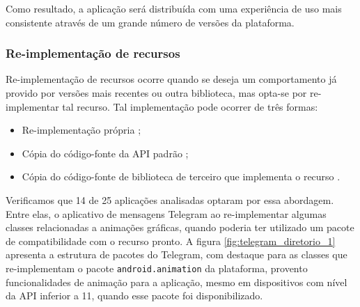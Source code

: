 Como resultado, a aplicação será distribuída com uma experiência de uso mais consistente
através de um grande número de versões da plataforma.

\subsubsection{Re-implementação de recursos}
\label{subsec:reimplementacao-recursos}

Re-implementação de recursos ocorre quando se deseja um comportamento já provido
por versões mais recentes ou outra biblioteca, mas opta-se por re-implementar tal
recurso. Tal implementação pode ocorrer de três formas:

\begin{itemize}
    \item Re-implementação própria \cite{Base642016};
    \item Cópia do código-fonte da API padrão \cite{StackOverflow2016};
    \item Cópia do código-fonte de biblioteca de terceiro que implementa o recurso
    \cite{NineOldAndroids}.
\end{itemize}

Verificamos que 14 de 25 aplicações analisadas optaram por essa abordagem. Entre
elas, o aplicativo de mensagens Telegram ao re-implementar algumas classes relacionadas
a animações gráficas, quando poderia ter utilizado um pacote de compatibilidade
com o recurso pronto. A figura \ref{fig:telegram_diretorio_1} apresenta a estrutura
de pacotes do Telegram, com destaque para as classes que re-implementam o pacote
\texttt{android.animation} da plataforma, provento funcionalidades de animação
para a aplicação, mesmo em dispositivos com nível da API inferior a 11, quando
esse pacote foi disponibilizado.

